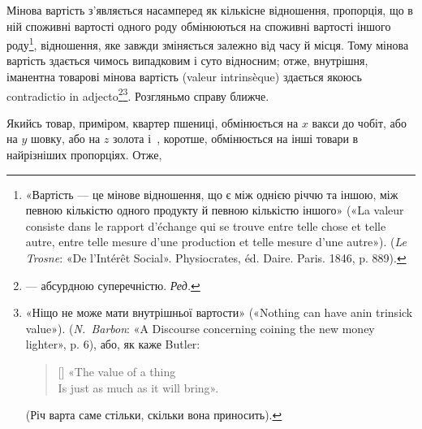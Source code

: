 Мінова вартість з’являється насамперед як кількісне відношення,
пропорція, що в ній споживні вартості одного роду обмінюються
на споживні вартості іншого роду\footnote{
«Вартість — це мінове відношення, що є між однією річчю та іншою,
між певною кількістю одного продукту й певною кількістю іншого»
(«La valeur consiste dans le rapport d’échange qui se trouve entre telle
chose et telle autre, entre telle mesure d’une production et telle mesure
d’une autre»). (\emph{Le Trosne}: «De l’Intérêt Social». Physiocrates, éd. Daire.
Paris. 1846, p. 889).
}, відношення, яке
завжди зміняється залежно від часу й місця. Тому мінова вартість
здається чимось випадковим і суто відносним; отже, внутрішня,
іманентна товарові мінова вартість (valeur intrinsèque) здається
якоюсь contradictio in adjecto\footnote*{
— абсурдною суперечністю. \emph{Ред.}
}\footnote{
«Ніщо не може мати внутрішньої вартости» («Nothing can have
anin trinsick value»). (\emph{N.~Barbon}: «A Discourse concerning coining the new
money lighter», p. 6), або, як каже Butler:
\settowidth{\versewidth}{Is just as much as it will bring».}
\begin{verse}[\versewidth]
«The value of a thing \\
Is just as much as it will bring».
\end{verse}
(Річ варта саме стільки, скільки вона приносить).
}. Розгляньмо справу ближче.

Якийсь товар, приміром, квартер пшениці, обмінюється на $x$
вакси до чобіт, або на $y$ шовку, або на $z$ золота і~, коротше,
обмінюється на інші товари в найрізніших пропорціях. Отже,
\parbreak{}  %
